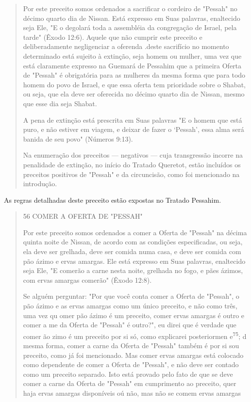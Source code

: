 \begin{quote}
Por este preceito somos ordenados a sacrificar o cordeiro de "Pes­sah"
no décimo quarto dia de Nissan. Está expresso em Suas palavras,
enalteci­do seja Ele, "E o degolará toda a assembléia da congregação de
Israel, pela tar­de" (Êxodo 12:6). Aquele que não cumprir este preceito
e deliberadamente ne­gligenciar a oferenda .deste sacrifício no momento
determinado está sujeito à extinção, seja homem ou mulher, uma vez que
está claramente expresso na Gue­mará de Pessahim que a primeira Oferta
de "Pessah" é obrigatória para as mu­lheres da mesma forma que para todo
homem do povo de Israel, e que essa oferta tem prioridade sobre o
Shabat, ou seja, que ela deve ser oferecida no décimo quarto dia de
Nissan, mesmo que esse dia seja Shabat.

A pena de extinção está prescrita em Suas palavras "E o homem que está
puro, e não estiver em viagem, e deixar de fazer o `Pessah', essa alma
será banida de seu povo" (Números 9:13).

Na enumeração dos preceitos --- negativos --- cuja transgressão in­corre
na penalidade de extinção, no início do Tratado Queretot, estão
incluí­dos os preceitos positivos de "Pessah" e da circuncisão, como foi
mencionado na introdução.
\end{quote}

As regras detalhadas deste preceito estão expostas no Tratado Pessahim.

\begin{quote}
56 COMER A OFERTA DE "PESSAH"

Por este preceito somos ordenados a comer a Oferta de "Pessah" na décima
quinta noite de Nissan, de acordo com as condições especificadas, ou
seja, ela deve ser grelhada, deve ser comida numa casa, e deve ser
comida com pão ázimo e ervas amargas. Ele está expresso em Suas
palavras, enaltecido seja Ele, "E comerão a carne nesta noite, grelhada
no fogo, e pães ázimos, com ervas amargas comerão" (Êxodo 12:8).

Se alguém perguntar: "Por que você conta comer a Oferta de "Pes­sah", o
pão ázimo e as ervas amargas como um único preceito, e não como três,
uma vez qu omer pão ázimo é um preceito, comer ervas amargas é ou­tro e
comer a me da Oferta de "Pessah" é outro?", eu direi que é verdade que
comer ão zimo é um preceito por si só, como explicarei posteriormen
e\textsuperscript{75}; d mesma forma, comer a carne da Oferta de
"Pessah" tam­bém é por si sou preceito, como já foi mencionado. Mas
comer ervas amar­gas está colocado como dependente de comer a Oferta de
"Pessah", e não de­ve ser contado como um preceito separado. Isto está
provado pelo fato de que se deve comer a carne da Oferta de "Pessah" em
cumprimento ao preceito, quer haja ervas amargas disponíveis oú não, mas
não se comem ervas amargas
\end{quote}

